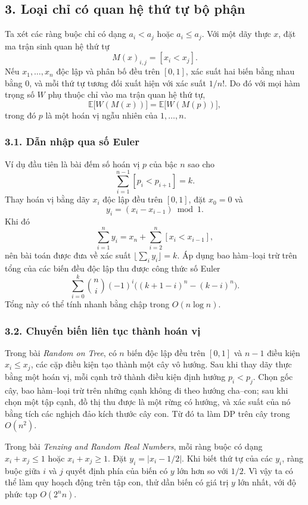 \documentclass[11pt]{article}
\begin{document}
\subsection*{3. Loại chỉ có quan hệ thứ tự bộ phận}

Ta xét các ràng buộc chỉ có dạng \(a_i<a_j\) hoặc \(a_i\le a_j\). Với một dãy
thực \(x\), đặt ma trận sinh quan hệ thứ tự
\[
  M(x)_{i,j}=[x_i<x_j].
\]
Nếu \(x_1,\ldots,x_n\) độc lập và phân bố đều trên \([0,1]\), xác suất hai biến
bằng nhau bằng \(0\), và mỗi thứ tự tương đối xuất hiện với xác suất \(1/n!\).
Do đó với mọi hàm trọng số \(W\) phụ thuộc chỉ vào ma trận quan hệ thứ tự,
\[
  \mathbb{E}\bigl[W(M(x))\bigr]
  =
  \mathbb{E}\bigl[W(M(p))\bigr],
\]
trong đó \(p\) là một hoán vị ngẫu nhiên của \(1,\ldots,n\).

\subsubsection*{3.1. Dẫn nhập qua số Euler}

Ví dụ đầu tiên là bài đếm số hoán vị \(p\) của bậc \(n\) sao cho
\[
  \sum_{i=1}^{n-1} [p_i<p_{i+1}]=k.
\]
Thay hoán vị bằng dãy \(x_i\) độc lập đều trên \([0,1]\), đặt \(x_0=0\) và
\[
  y_i=(x_i-x_{i-1}) \bmod 1.
\]
Khi đó
\[
  \sum_{i=1}^{n} y_i
  =
  x_n+\sum_{i=2}^{n}[x_i<x_{i-1}],
\]
nên bài toán được đưa về xác suất \(\lfloor\sum_i y_i\rfloor=k\). Áp dụng bao
hàm--loại trừ trên tổng của các biến đều độc lập thu được công thức số Euler
\[
  \sum_{i=0}^{k} \binom{n}{i}(-1)^i
  \bigl((k+1-i)^n-(k-i)^n\bigr).
\]
Tổng này có thể tính nhanh bằng chập trong \(O(n\log n)\).

\subsubsection*{3.2. Chuyển biến liên tục thành hoán vị}

Trong bài \emph{Random on Tree}, có \(n\) biến độc lập đều trên \([0,1]\) và
\(n-1\) điều kiện \(x_i\le x_j\), các cặp điều kiện tạo thành một cây vô hướng.
Sau khi thay dãy thực bằng một hoán vị, mỗi cạnh trở thành điều kiện định hướng
\(p_i<p_j\). Chọn gốc cây, bao hàm--loại trừ trên những cạnh không đi theo hướng
cha--con; sau khi chọn một tập cạnh, đồ thị thu được là một rừng có hướng, và
xác suất của nó bằng tích các nghịch đảo kích thước cây con. Từ đó ta làm DP
trên cây trong \(O(n^2)\).

Trong bài \emph{Tenzing and Random Real Numbers}, mỗi ràng buộc có dạng
\(x_i+x_j\le 1\) hoặc \(x_i+x_j\ge 1\). Đặt \(y_i=|x_i-1/2|\). Khi biết thứ tự
của các \(y_i\), ràng buộc giữa \(i\) và \(j\) quyết định phía của biến có
\(y\) lớn hơn so với \(1/2\). Vì vậy ta có thể làm quy hoạch động trên tập con,
thử dần biến có giá trị \(y\) lớn nhất, với độ phức tạp \(O(2^n n)\).
\end{document}
